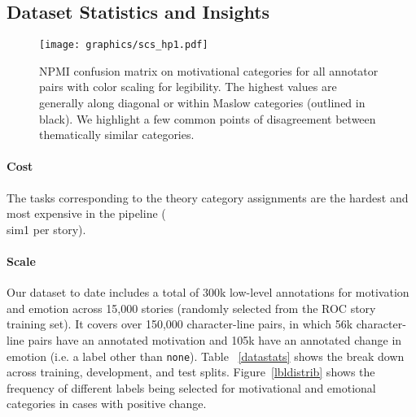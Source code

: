 \documentclass[11pt,a4paper]{article}
\begin{document}
\subsection{Dataset Statistics and Insights}

\begin{figure*}[tb]
\begin{centering}
\texttt{[image: graphics/scs\_hp1.pdf]}
\vspace*{-2mm}
\caption{NPMI confusion matrix on motivational categories for all annotator pairs with color scaling for legibility. The highest values are generally along diagonal or within Maslow categories (outlined in black).  We highlight a few common points of disagreement between thematically similar categories.}
\label{maslow-heatmap}
\end{centering}
\end{figure*}
\paragraph{Cost}
The tasks corresponding to the theory category assignments are the hardest and most expensive in the pipeline (\\sim1 per story). 

\paragraph{Scale} 
Our dataset to date includes a total of 300k low-level annotations for motivation and emotion across 15,000 stories (randomly selected from the ROC story training set).  It covers over 150,000 character-line pairs, in which 56k character-line pairs have an annotated motivation and 105k have an annotated change in emotion (i.e. a label other than \texttt{none}). Table ~\ref{datastats} shows the break down across training, development, and test splits. Figure~\ref{lbldistrib} shows the frequency of different labels being selected for motivational and emotional categories in cases with positive change. 
\end{document}

